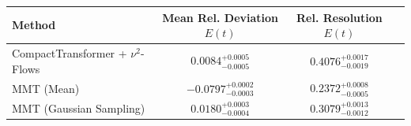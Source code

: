     \begin{tabular}{lccc}
        \toprule
        Method & Mean Rel. Deviation $E(t)$ & Rel. Resolution $E(t)$ \\
        \midrule
        CompactTransformer + $\nu^2$-Flows & $0.0084^{+0.0005}_{-0.0005}$ & $0.4076^{+0.0017}_{-0.0019}$ \\
        MMT (Mean) & $-0.0797^{+0.0002}_{-0.0003}$ & $0.2372^{+0.0008}_{-0.0005}$ \\
        MMT (Gaussian Sampling) & $0.0180^{+0.0003}_{-0.0004}$ & $0.3079^{+0.0013}_{-0.0012}$ \\
        \bottomrule
    \end{tabular}